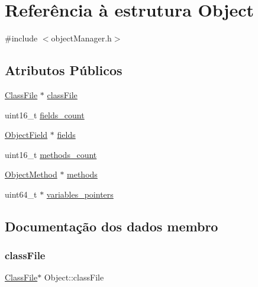 \hypertarget{struct_object}{}\section{Referência à estrutura Object}
\label{struct_object}


{\ttfamily \#include $<$object\+Manager.\+h$>$}

\subsection*{Atributos Públicos}
\begin{DoxyCompactItemize}
\item 
\hyperlink{struct_class_file}{Class\+File} $\ast$ \hyperlink{struct_object_afd64a3d47458a977a78a3e8352bbadec}{class\+File}
\item 
uint16\+\_\+t \hyperlink{struct_object_afd66bddbfa4612c4b925f2ca09d7c383}{fields\+\_\+count}
\item 
\hyperlink{struct_object_field}{Object\+Field} $\ast$ \hyperlink{struct_object_a5153b62d50690bf7dd91ff17af36ad41}{fields}
\item 
uint16\+\_\+t \hyperlink{struct_object_ace96f6f6833031c2327e22f85f592347}{methods\+\_\+count}
\item 
\hyperlink{struct_object_method}{Object\+Method} $\ast$ \hyperlink{struct_object_aecd81fad0869e3f7263cc910cd16864a}{methods}
\item 
uint64\+\_\+t $\ast$ \hyperlink{struct_object_a9ea1c3bc8e1735168f9b9175931420e3}{variables\+\_\+pointers}
\end{DoxyCompactItemize}


\subsection{Documentação dos dados membro}
\hypertarget{struct_object_afd64a3d47458a977a78a3e8352bbadec}{}\label{struct_object_afd64a3d47458a977a78a3e8352bbadec} 
\subsubsection{\texorpdfstring{class\+File}{classFile}}
{\footnotesize\ttfamily \hyperlink{struct_class_file}{Class\+File}$\ast$ Object\+::class\+File}

\hypertarget{struct_object_a5153b62d50690bf7dd91ff17af36ad41}{}\label{struct_object_a5153b62d50690bf7dd91ff17af36ad41} 
